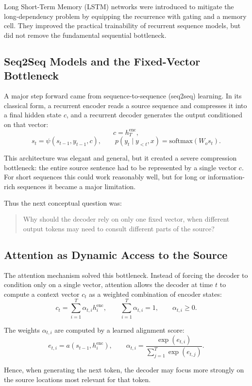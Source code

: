 Long Short-Term Memory (LSTM) networks were introduced to mitigate the long-dependency problem by equipping the recurrence with gating and a memory cell. They improved the practical trainability of recurrent sequence models, but did not remove the fundamental sequential bottleneck.

\subsection{Seq2Seq Models and the Fixed-Vector Bottleneck}

A major step forward came from sequence-to-sequence (seq2seq) learning. In its classical form, a recurrent encoder reads a source sequence and compresses it into a final hidden state \(c\), and a recurrent decoder generates the output conditioned on that vector:
\[
c = h_T^{\text{enc}},
\]
\[
s_t = \psi(s_{t-1}, y_{t-1}, c),
\qquad
p(y_t \mid y_{<t},x) = \mathrm{softmax}(W_o s_t).
\]

This architecture was elegant and general, but it created a severe compression bottleneck: the entire source sentence had to be represented by a single vector \(c\). For short sequences this could work reasonably well, but for long or information-rich sequences it became a major limitation.

Thus the next conceptual question was:

\begin{quote}
Why should the decoder rely on only one fixed vector, when different output tokens may need to consult different parts of the source?
\end{quote}

\subsection{Attention as Dynamic Access to the Source}

The attention mechanism solved this bottleneck. Instead of forcing the decoder to condition only on a single vector, attention allows the decoder at time \(t\) to compute a context vector \(c_t\) as a weighted combination of encoder states:
\[
c_t = \sum_{i=1}^T \alpha_{t,i} h_i^{\text{enc}},
\qquad
\sum_{i=1}^T \alpha_{t,i} = 1,
\qquad
\alpha_{t,i} \ge 0.
\]

The weights \(\alpha_{t,i}\) are computed by a learned alignment score:
\[
e_{t,i} = a(s_{t-1}, h_i^{\text{enc}}),
\qquad
\alpha_{t,i} = \frac{\exp(e_{t,i})}{\sum_{j=1}^T \exp(e_{t,j})}.
\]

Hence, when generating the next token, the decoder may focus more strongly on the source locations most relevant for that token.

